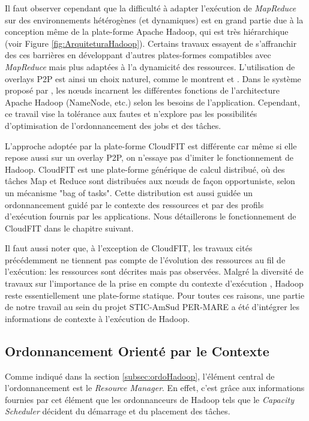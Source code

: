 Il faut observer cependant que la difficulté à adapter l'exécution de \textit{MapReduce} sur des environnements hétérogènes (et dynamiques) est en grand partie due à la conception même de la plate-forme Apache Hadoop, qui est très hiérarchique (voir Figure \ref{fig:ArquiteturaHadoop}). Certains travaux essayent de s'affranchir des ces barrières en développant d'autres plates-formes compatibles avec \textit{MapReduce} mais plus adaptées à l'a dynamicité des ressources.  L'utilisation de overlays P2P est ainsi un choix naturel, comme le montrent \cite{Marozzo2012} et \cite{Steffenel20151034}. Dans le système proposé par \cite{Marozzo2012}, les n{\oe}uds incarnent les différentes fonctions de l'architecture Apache Hadoop (NameNode, etc.) selon les besoins de l'application. Cependant, ce travail vise la tolérance aux fautes et n'explore pas les possibilités d'optimisation de l'ordonnancement des jobs et des tâches. 

L'approche adoptée par la plate-forme CloudFIT \cite{Steffenel20151034} est différente car même si elle repose aussi sur un overlay P2P, on n'essaye pas d'imiter le fonctionnement de Hadoop. CloudFIT est une plate-forme générique de calcul distribué, où des tâches Map et Reduce sont distribuées aux n{\oe}uds de façon opportuniste, selon un mécanisme "bag of tasks". Cette distribution est aussi guidée un ordonnancement guidé par le contexte des ressources et par des profils d'exécution fournis par les applications. Nous détaillerons le fonctionnement de CloudFIT dans le chapitre suivant.

Il faut aussi noter que, à l'exception de CloudFIT, les travaux cités précédemment ne tiennent pas compte de l'évolution des ressources au fil de l'exécution: les ressources sont décrites mais pas observées. Malgré la diversité de travaux sur l'importance de la prise en compte du contexte d'exécution \cite{Baldauf, Maamar, Ramakrishnan2014, Najar2015}, Hadoop reste essentiellement une plate-forme statique. Pour toutes ces raisons, une partie de notre travail au sein du projet STIC-AmSud PER-MARE a été d'intégrer les informations de contexte à l'exécution de Hadoop.

\subsection{Ordonnancement Orienté par le Contexte} \label{sec:desenv}

Comme indiqué dans la section \ref{subsec:ordoHadoop}, l'élément central de l'ordonnancement est le \textit{Resource Manager}. En effet, c'est grâce aux informations fournies par cet élément que les ordonnanceurs de Hadoop tels que le \textit{Capacity Scheduler} décident du démarrage et du placement des tâches. 

